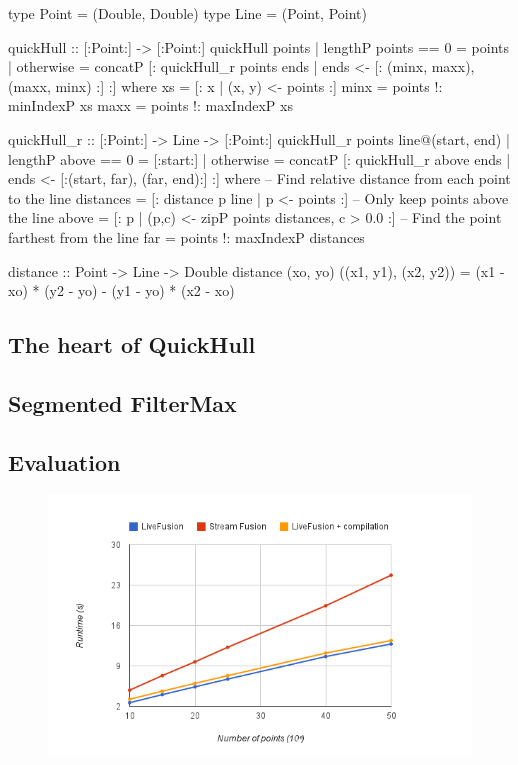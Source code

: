 \documentclass[preamble.tex]{subfiles}
\begin{document}
\begin{hscode}[%
  caption={\label{fig:dph-qh}\name{Data Parallel Haskell} implementation of QuickHull.},
]
type Point = (Double, Double)
type Line  = (Point,  Point)

quickHull :: [:Point:] -> [:Point:]
quickHull points
  | lengthP points == 0 = points
  | otherwise
  = concatP [: quickHull_r points ends
                 | ends <- [: (minx, maxx), (maxx, minx) :] :]
  where
    xs   = [: x | (x, y) <- points :]
    minx = points !: minIndexP xs
    maxx = points !: maxIndexP xs

quickHull_r :: [:Point:] -> Line -> [:Point:]
quickHull_r points line@(start, end)
  | lengthP above == 0 = [:start:]
  | otherwise
  = concatP [: quickHull_r above ends
                 | ends <- [:(start, far), (far, end):] :]
  where
    -- Find relative distance from each point to the line
    distances = [: distance p line | p <- points :]
    -- Only keep points above the line
    above = [: p | (p,c) <- zipP points distances, c > 0.0 :]
    -- Find the point farthest from the line
    far = points !: maxIndexP distances

distance :: Point -> Line -> Double
distance (xo, yo) ((x1, y1), (x2, y2))
  = (x1 - xo) * (y2 - yo) - (y1 - yo) * (x2 - xo)
\end{hscode}



\subsection{The heart of QuickHull}

\subsection{Segmented FilterMax}

\subsection{Evaluation}

\begin{figure}
\includegraphics[center]{img/Eval-QuickHull}
\end{figure}
\end{document}
